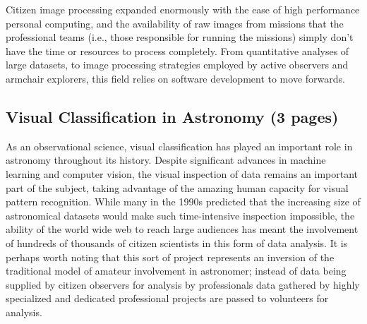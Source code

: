 \documentclass{ar2e}
\begin{document}

Citizen image processing expanded enormously with the ease of high performance
personal computing, and the availability of raw images from missions that the
professional teams (i.e., those responsible for running the missions) simply
don't have the time or resources to process completely.  From quantitative
analyses of large datasets, to image processing strategies employed by active
observers and armchair explorers, this field relies on software development to
move forwards.


\subsection{Visual Classification in Astronomy (3 pages)}
\label{sec:class:astro}


As an observational science, visual classification has played an important role
in astronomy throughout its history. Despite significant advances in machine
learning and computer vision, the visual inspection of data remains an important
part of the subject, taking advantage of the amazing human capacity for visual
pattern recognition. While many in the 1990s predicted that the increasing size
of astronomical datasets would make such time-intensive inspection impossible,
the ability of the world wide web to reach large audiences has meant the
involvement of hundreds of thousands of citizen scientists in this form of data
analysis. It is perhaps worth noting that this sort of project represents an
inversion of the traditional model of amateur involvement in astronomer; instead
of data being supplied by citizen observers for analysis by professionals data
gathered by highly specialized and dedicated professional projects are passed to
volunteers for analysis. 

\end{document}
